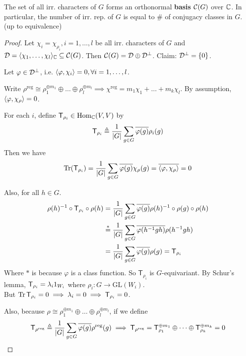 \begin{theorem}
  The set of all irr. characters of $G$ forms an orthonormal {\bf basis}
  $\mathcal{C}(G)$ over $\mathbb{C}$. In particular, the number of irr. rep. of $G$ is equal
  to \# of conjugacy classes in $G$. (up to equivalence)

  \begin{proof}
    Let $\chi_i = \chi_{\rho_i}, i = 1, \dots, l$ be all irr.
    characters of $G$ and $\mathcal{D} = \langle\chi_1, \dots, \chi_l\rangle_{\mathbb{C}}
    \subseteq \mathcal{C}(G)$. Then $\mathcal{C}(G) = \mathcal{D} \oplus \mathcal{D}^\perp$.
    Claim: $\mathcal{D}^\perp = \{0\}$.

    Let $\varphi \in \mathcal{D}^\perp$, i.e. $\langle\varphi, \chi_i\rangle = 0,
    \forall i = 1,\dots, l$.

    Write $\rho^{\text{reg}} \cong \rho_1^{\oplus m_1} \oplus\dots\oplus\rho_l^{\oplus m_l}
    \implies \chi^{\text{reg}} = m_1\chi_1 + \dots + m_k\chi_l$.
    By assumption, $\langle\varphi, \chi_\rho\rangle = 0$.

    For each $i$, define ${\sf T}_{\rho_i} \in \operatorname{Hom}_{\mathbb{C}}(V, V)$ by
      \[
        {\sf T}_{\rho_i} \triangleq
        \frac{1}{\lvert G\rvert} \sum_{g\in G} \overline{\varphi(g)} \rho_i(g)
      \]
    Then we have
      \[
        \operatorname{Tr}({\sf T}_{\rho_i}) =
        \frac{1}{\lvert G\rvert} \sum_{g\in G} \overline{\varphi(g)} \chi_\rho(g)
        = \overline{\langle\varphi, \chi_\rho\rangle} = 0
      \]

      Also, for all $h \in G$.
      \begin{align*}
        \rho(h)^{-1}\circ{\sf T}_{\rho_i} \circ\rho(h)
        &= \frac{1}{\lvert G\rvert} \sum_{g\in G}
        \overline{\varphi(g)} \rho(h)^{-1}\circ\rho(g)\circ\rho(h) \\
        & \stackrel{*}{=} \frac{1}{\lvert G\rvert} \sum_{g \in G} \overline{\varphi(h^{-1} g h)} \rho(h^{-1}gh) \\
        & = \frac{1}{\lvert G\rvert} \sum_{g \in G} \overline{\varphi(g)} \rho(g) = \mathsf{T}_{\rho_i}
      \end{align*}
      Where $*$ is because $\varphi$ is a class function.  So $\mathsf{T}_{\rho_i}$ is $G$-equivariant.
      By Schur's lemma,
      ${\sf T}_{\rho_i} = \lambda_i 1_{W_i}$ where
      $\rho_i: G\to \text{GL}(W_i)$. \\
      But $\operatorname{Tr}{{\sf T}_{\rho_i}} = 0 \implies \lambda_i = 0
      \implies {\sf T}_{\rho_i} = 0$.

      Also, because $\rho \cong \rho_1^{\oplus m_1} \oplus\dots\oplus\rho_l^{\oplus m_l}$,
      if we define
      \[
        {\sf T}_{\rho^{\text{reg}}} \triangleq
        \frac{1}{\lvert G\rvert} \sum_{g\in G} \overline{\varphi(g)} \rho^{\text{reg}}(g)
        \implies \mathsf{T}_{\rho^{\text{reg}}}
        = \mathsf{T}^{\oplus m_1}_{\rho_1} \oplus \cdots \oplus
        \mathsf{T}^{\oplus m_k}_{\rho_k} = 0
      \]


\end{proof}
\end{theorem}
